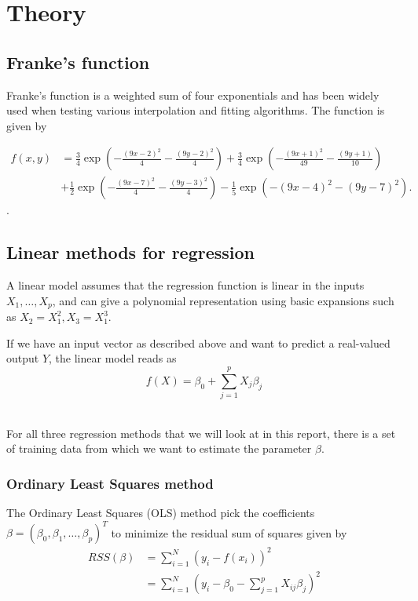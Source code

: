 \section{Theory}

\subsection{Franke's function}

Franke's function is a weighted sum of four exponentials and has been 
widely used when testing various interpolation and fitting algorithms.
The function is given by 

\begin{align*}
	f(x,y) &= 
	\frac{3}{4}\exp{\left(-\frac{(9x-2)^2}{4} 
	- \frac{(9y-2)^2}{4}\right)}
	+\frac{3}{4}\exp{\left(-\frac{(9x+1)^2}{49}
	- \frac{(9y+1)}{10}\right)} \\
	&+\frac{1}{2}\exp{\left(-\frac{(9x-7)^2}{4} 
	- \frac{(9y-3)^2}{4}\right)} 
	-\frac{1}{5}\exp{\left(-(9x-4)^2 - (9y-7)^2\right) }.
\end{align*}. 
~\cite{Project1}

\subsection{Linear methods for regression}

A linear model assumes that the regression function is linear in the 
inputs \(X_1, \dots, X_p\), and can give a polynomial representation
using basic expansions such as \(X_2 = X_1^2, X_3 = X_1^3\). 

If we have an input vector as described above and want to predict 
a real-valued output \(Y\), the linear model reads as
\begin{equation}
	f(X) = \beta_0 + \sum\limits_{j=1}^p X_j\beta_j
\end{equation}
~\cite{IntroStatistics}

For all three regression methods that we will look at in this report, 
there is a set of training data from which we want to estimate the parameter 
\(\beta\). 

\subsubsection{Ordinary Least Squares method}\label{sec:ols}
The Ordinary Least Squares (OLS) method pick the coefficients
\(\beta = (\beta_0, \beta_1, \dots, \beta_p)^T\) to minimize the 
residual sum of squares given by
\begin{align}
	RSS(\beta) &= \sum\limits_{i=1}^N (y_i - f(x_i))^2\\
				&= \sum\limits_{i=1}^N 
				(y_i - \beta_0 - \sum\limits_{j=1}^p X_{ij}\beta_j )^2\\
\end{align}

